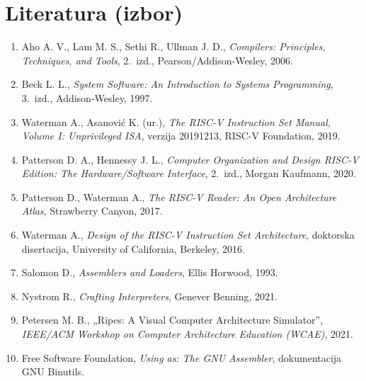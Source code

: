\documentclass[11pt,a4paper]{article}
\begin{document}
\section{Literatura (izbor)}

\begin{enumerate}[label=\arabic*., leftmargin=1.6em]
  \item Aho A. V., Lam M. S., Sethi R., Ullman J. D., \emph{Compilers: Principles, Techniques,
        and Tools}, 2.~izd., Pearson/Addison-Wesley, 2006.
  \item Beck L. L., \emph{System Software: An Introduction to Systems Programming}, 3.~izd.,
        Addison-Wesley, 1997.
  \item Waterman A., Asanović K. (ur.), \emph{The RISC-V Instruction Set Manual, Volume I:
        Unprivileged ISA}, verzija 20191213, RISC-V Foundation, 2019.
  \item Patterson D. A., Hennessy J. L., \emph{Computer Organization and Design RISC-V Edition:
        The Hardware/Software Interface}, 2.~izd., Morgan Kaufmann, 2020.
  \item Patterson D., Waterman A., \emph{The RISC-V Reader: An Open Architecture Atlas},
        Strawberry Canyon, 2017.
  \item Waterman A., \emph{Design of the RISC-V Instruction Set Architecture}, doktorska
        disertacija, University of California, Berkeley, 2016.
  \item Salomon D., \emph{Assemblers and Loaders}, Ellis Horwood, 1993.
  \item Nystrom R., \emph{Crafting Interpreters}, Genever Benning, 2021.
  \item Petersen M. B., „Ripes: A Visual Computer Architecture Simulator”, \emph{IEEE/ACM
        Workshop on Computer Architecture Education (WCAE)}, 2021.
  \item Free Software Foundation, \emph{Using as: The GNU Assembler}, dokumentacija GNU Binutils.
\end{enumerate}
\end{document}
